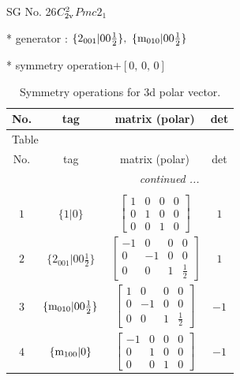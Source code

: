 \documentclass[fleqn,8pt]{jsarticle}
\begin{document}
\setcounter{MaxMatrixCols}{32}

\renewcommand{\tablename}{Table~}
\renewcommand{\figurename}{Figure~}
\begin{center}
\LARGE
SG No. 26\quad$C_{\rm 2v}^{2}$\quad$Pmc2_1$\quad[ orthorhombic ]
\end{center}

* generator : $\{2{}_{001}|0 0 \frac{1}{2}\},\,\,\{{\rm m}_{010}|0 0 \frac{1}{2}\}$

* symmetry operation\quad$+\left[ 0,\, 0,\, 0 \right]$
\renewcommand{\arraystretch}{1.3}
\begin{longtable}{cccc}
\caption{Symmetry operations for 3d polar vector.}
 \\
 \hline \hline
No. & tag & matrix (polar) & det \\ \hline \endfirsthead

\multicolumn{3}{l}{\tablename\ \thetable{}} \\
 \hline \hline
No. & tag & matrix (polar) & det \\ \hline \endhead

 \hline \hline
\multicolumn{3}{r}{\footnotesize\it continued ...} \\ \endfoot

 \hline \hline
\multicolumn{3}{r}{} \\ \endlastfoot

$ 1 $ & $ \{1|0\} $ & $ \begin{bmatrix} 1 & 0 & 0 & 0 \\ 0 & 1 & 0 & 0 \\ 0 & 0 & 1 & 0 \end{bmatrix} $ & $ 1 $ \\ \hline
$ 2 $ & $ \{2{}_{001}|0 0 \frac{1}{2}\} $ & $ \begin{bmatrix} -1 & 0 & 0 & 0 \\ 0 & -1 & 0 & 0 \\ 0 & 0 & 1 & \frac{1}{2} \end{bmatrix} $ & $ 1 $ \\ \hline
$ 3 $ & $ \{{\rm m}_{010}|0 0 \frac{1}{2}\} $ & $ \begin{bmatrix} 1 & 0 & 0 & 0 \\ 0 & -1 & 0 & 0 \\ 0 & 0 & 1 & \frac{1}{2} \end{bmatrix} $ & $ -1 $ \\ \hline
$ 4 $ & $ \{{\rm m}_{100}|0\} $ & $ \begin{bmatrix} -1 & 0 & 0 & 0 \\ 0 & 1 & 0 & 0 \\ 0 & 0 & 1 & 0 \end{bmatrix} $ & $ -1 $ \\
\end{longtable}
\end{document}
